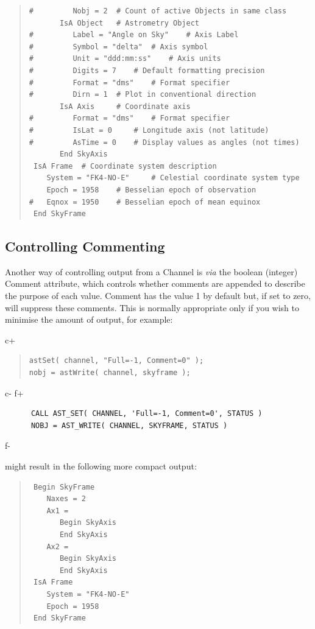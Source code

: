 \documentclass[twoside,11pt]{article}
\begin{document}
\begin{quote}
\begin{verbatim}
#         Nobj = 2 	# Count of active Objects in same class
       IsA Object 	# Astrometry Object
#         Label = "Angle on Sky" 	# Axis Label
#         Symbol = "delta" 	# Axis symbol
#         Unit = "ddd:mm:ss" 	# Axis units
#         Digits = 7 	# Default formatting precision
#         Format = "dms" 	# Format specifier
#         Dirn = 1 	# Plot in conventional direction
       IsA Axis 	# Coordinate axis
#         Format = "dms" 	# Format specifier
#         IsLat = 0 	# Longitude axis (not latitude)
#         AsTime = 0 	# Display values as angles (not times)
       End SkyAxis
 IsA Frame 	# Coordinate system description
    System = "FK4-NO-E" 	# Celestial coordinate system type
    Epoch = 1958 	# Besselian epoch of observation
#   Eqnox = 1950 	# Besselian epoch of mean equinox
 End SkyFrame
\end{verbatim}
\normalsize
\end{quote}

\subsection{\label{ss:channelcommenting}Controlling Commenting}

Another way of controlling output from a Channel is {\em{via}} the
boolean (integer) Comment attribute, which controls whether comments
are appended to describe the purpose of each value. Comment has the
value 1 by default but, if set to zero, will suppress these
comments. This is normally appropriate only if you wish to minimise
the amount of output, for example:

c+
\begin{quote}
\small
\begin{verbatim}
astSet( channel, "Full=-1, Comment=0" );
nobj = astWrite( channel, skyframe );
\end{verbatim}
\normalsize
\end{quote}
c-
f+
\small
\begin{verbatim}
      CALL AST_SET( CHANNEL, 'Full=-1, Comment=0', STATUS )
      NOBJ = AST_WRITE( CHANNEL, SKYFRAME, STATUS )
\end{verbatim}
\normalsize
f-

might result in the following more compact output:

\begin{quote}
\small
\begin{verbatim}
 Begin SkyFrame
    Naxes = 2
    Ax1 =
       Begin SkyAxis
       End SkyAxis
    Ax2 =
       Begin SkyAxis
       End SkyAxis
 IsA Frame
    System = "FK4-NO-E"
    Epoch = 1958
 End SkyFrame
\end{verbatim}
\normalsize
\end{quote}
\end{document}
